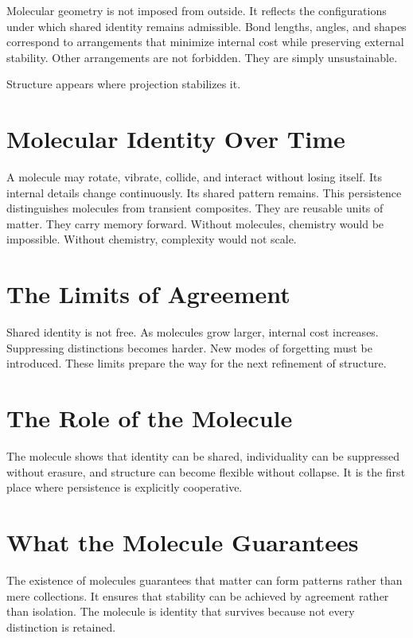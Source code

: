 \documentclass[11pt,twoside,openright]{book}
\begin{document}
Molecular geometry is not imposed from outside. It reflects the configurations under which shared identity remains admissible. Bond lengths, angles, and shapes correspond to arrangements that minimize internal cost while preserving external stability. Other arrangements are not forbidden. They are simply unsustainable.

Structure appears where projection stabilizes it.

\section*{Molecular Identity Over Time}

A molecule may rotate, vibrate, collide, and interact without losing itself. Its internal details change continuously. Its shared pattern remains. This persistence distinguishes molecules from transient composites. They are reusable units of matter. They carry memory forward. Without molecules, chemistry would be impossible. Without chemistry, complexity would not scale.

\section*{The Limits of Agreement}

Shared identity is not free. As molecules grow larger, internal cost increases. Suppressing distinctions becomes harder. New modes of forgetting must be introduced. These limits prepare the way for the next refinement of structure.

\section*{The Role of the Molecule}

The molecule shows that identity can be shared, individuality can be suppressed without erasure, and structure can become flexible without collapse. It is the first place where persistence is explicitly cooperative.

\section*{What the Molecule Guarantees}

The existence of molecules guarantees that matter can form patterns rather than mere collections. It ensures that stability can be achieved by agreement rather than isolation. The molecule is identity that survives because not every distinction is retained.
\end{document}

